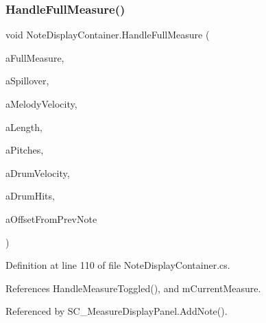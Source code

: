 \subsubsection{\texorpdfstring{Handle\+Full\+Measure()}{HandleFullMeasure()}}
{\footnotesize\ttfamily void Note\+Display\+Container.\+Handle\+Full\+Measure (\begin{DoxyParamCaption}\item[{\hyperlink{class_s_c___measure_display_panel}{S\+C\+\_\+\+Measure\+Display\+Panel}}]{a\+Full\+Measure,  }\item[{float}]{a\+Spillover,  }\item[{int}]{a\+Melody\+Velocity,  }\item[{\hyperlink{group___music_enums_gaf11b5f079adbb21c800b9eca1c5c3cbd}{Music.\+N\+O\+T\+E\+\_\+\+L\+E\+N\+G\+TH}}]{a\+Length,  }\item[{\hyperlink{group___music_enums_ga508f69b199ea518f935486c990edac1d}{Music.\+P\+I\+T\+CH} \mbox{[}$\,$\mbox{]}}]{a\+Pitches,  }\item[{int}]{a\+Drum\+Velocity,  }\item[{\hyperlink{group___music_enums_gade475b4382c7066d1af13e7c13c029b6}{Music.\+D\+R\+UM} \mbox{[}$\,$\mbox{]}}]{a\+Drum\+Hits,  }\item[{\hyperlink{group___music_enums_gaf11b5f079adbb21c800b9eca1c5c3cbd}{Music.\+N\+O\+T\+E\+\_\+\+L\+E\+N\+G\+TH}}]{a\+Offset\+From\+Prev\+Note }\end{DoxyParamCaption})}



Definition at line 110 of file Note\+Display\+Container.\+cs.



References Handle\+Measure\+Toggled(), and m\+Current\+Measure.



Referenced by S\+C\+\_\+\+Measure\+Display\+Panel.\+Add\+Note().


